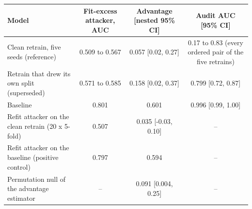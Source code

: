 \begin{tabular}{lccc}
\toprule
Model & Fit-excess attacker, AUC & Advantage [nested 95\% CI] & Audit AUC [95\% CI] \\
\midrule
Clean retrain, five seeds (reference) & 0.509 to 0.567 & 0.057 [0.02, 0.27] & 0.17 to 0.83 (every ordered pair of the five retrains) \\
Retrain that drew its own split (superseded) & 0.571 to 0.585 & 0.158 [0.02, 0.37] & 0.799 [0.72, 0.87] \\
Baseline & 0.801 & 0.601 & 0.996 [0.99, 1.00] \\
\midrule
Refit attacker on the clean retrain (20 x 5-fold) & 0.507 & 0.035 [-0.03, 0.10] & -- \\
Refit attacker on the baseline (positive control) & 0.797 & 0.594 & -- \\
Permutation null of the advantage estimator & -- & 0.091 [0.004, 0.25] & -- \\
\bottomrule
\end{tabular}

